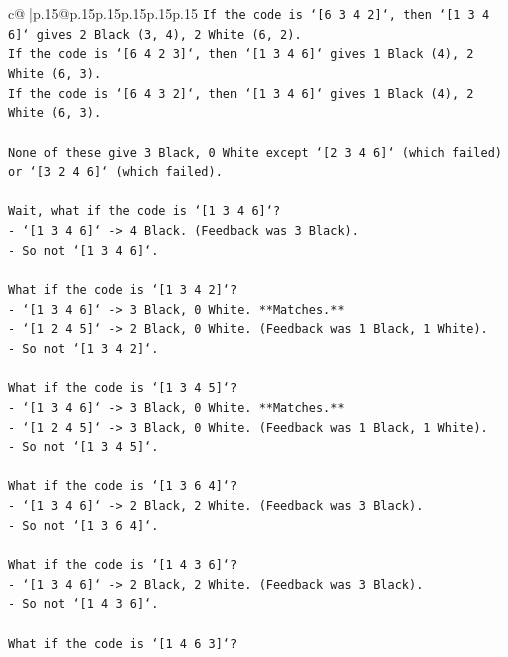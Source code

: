 \documentclass{article}
\begin{document}
{\begin{supertabular}{c@{$\;$}|p{.15\linewidth}@{}p{.15\linewidth}p{.15\linewidth}p{.15\linewidth}p{.15\linewidth}p{.15\linewidth}}
{{{\texttt{If the code is `{[}6 3 4 2{]}`, then `{[}1 3 4 6{]}` gives 2 Black (3, 4), 2 White (6, 2).} \\
\texttt{If the code is `{[}6 4 2 3{]}`, then `{[}1 3 4 6{]}` gives 1 Black (4), 2 White (6, 3).} \\
\texttt{If the code is `{[}6 4 3 2{]}`, then `{[}1 3 4 6{]}` gives 1 Black (4), 2 White (6, 3).} \\
\\ 
\texttt{None of these give 3 Black, 0 White except `{[}2 3 4 6{]}` (which failed) or `{[}3 2 4 6{]}` (which failed).} \\
\\ 
\texttt{Wait, what if the code is `{[}1 3 4 6{]}`?} \\
\texttt{{-} `{[}1 3 4 6{]}` {-}> 4 Black. (Feedback was 3 Black).} \\
\texttt{{-} So not `{[}1 3 4 6{]}`.} \\
\\ 
\texttt{What if the code is `{[}1 3 4 2{]}`?} \\
\texttt{{-} `{[}1 3 4 6{]}` {-}> 3 Black, 0 White. **Matches.**} \\
\texttt{{-} `{[}1 2 4 5{]}` {-}> 2 Black, 0 White. (Feedback was 1 Black, 1 White).} \\
\texttt{{-} So not `{[}1 3 4 2{]}`.} \\
\\ 
\texttt{What if the code is `{[}1 3 4 5{]}`?} \\
\texttt{{-} `{[}1 3 4 6{]}` {-}> 3 Black, 0 White. **Matches.**} \\
\texttt{{-} `{[}1 2 4 5{]}` {-}> 3 Black, 0 White. (Feedback was 1 Black, 1 White).} \\
\texttt{{-} So not `{[}1 3 4 5{]}`.} \\
\\ 
\texttt{What if the code is `{[}1 3 6 4{]}`?} \\
\texttt{{-} `{[}1 3 4 6{]}` {-}> 2 Black, 2 White. (Feedback was 3 Black).} \\
\texttt{{-} So not `{[}1 3 6 4{]}`.} \\
\\ 
\texttt{What if the code is `{[}1 4 3 6{]}`?} \\
\texttt{{-} `{[}1 3 4 6{]}` {-}> 2 Black, 2 White. (Feedback was 3 Black).} \\
\texttt{{-} So not `{[}1 4 3 6{]}`.} \\
\\ 
\texttt{What if the code is `{[}1 4 6 3{]}`?} \\
}}}
\end{supertabular}}
\end{document}
